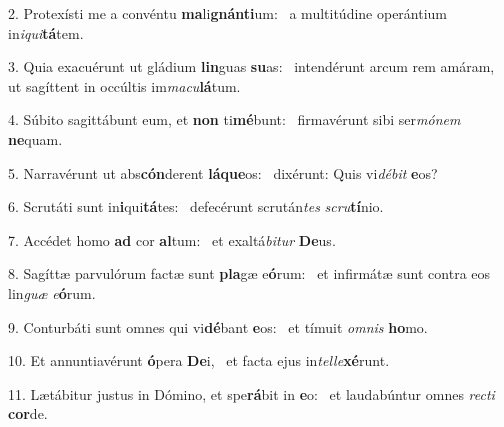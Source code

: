 2. Protexísti me a convéntu \textbf{ma}li\textbf{gnán}\textbf{ti}um: \ast\  a multitúdine operántium in\textit{i}\textit{qui}\textbf{tá}tem.\

3. Quia exacuérunt ut gládium \textbf{lin}guas \textbf{su}as: \ast\  intendérunt arcum rem amáram, ut sagíttent in occúltis im\textit{ma}\textit{cu}\textbf{lá}tum.\

4. Súbito sagittábunt eum, et \textbf{non} ti\textbf{mé}bunt: \ast\  firmavérunt sibi ser\textit{mó}\textit{nem} \textbf{ne}quam.\

5. Narravérunt ut abs\textbf{cón}derent \textbf{lá}\textbf{que}os: \ast\  dixérunt: Quis vi\textit{dé}\textit{bit} \textbf{e}os?\

6. Scrutáti sunt in\textbf{i}qui\textbf{tá}tes: \ast\  defecérunt scrután\textit{tes} \textit{scru}\textbf{tí}nio.\

7. Accédet homo \textbf{ad} cor \textbf{al}tum: \ast\  et exaltá\textit{bi}\textit{tur} \textbf{De}us.\

8. Sagíttæ parvulórum factæ sunt \textbf{pla}gæ e\textbf{ó}rum: \ast\  et infirmátæ sunt contra eos lin\textit{guæ} \textit{e}\textbf{ó}rum.\

9. Conturbáti sunt omnes qui vi\textbf{dé}bant \textbf{e}os: \ast\  et tímuit \textit{om}\textit{nis} \textbf{ho}mo.\

10. Et annuntiavérunt \textbf{ó}pera \textbf{De}i, \ast\  et facta ejus in\textit{tel}\textit{le}\textbf{xé}runt.\

11. Lætábitur justus in Dómino, et spe\textbf{rá}bit in \textbf{e}o: \ast\  et laudabúntur omnes \textit{rec}\textit{ti} \textbf{cor}de.\


